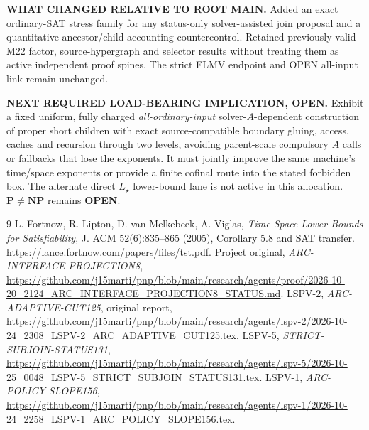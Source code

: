 \documentclass[11pt]{article}
\begin{document}
\noindent\textbf{WHAT CHANGED RELATIVE TO ROOT MAIN.}
Added an exact ordinary-SAT stress family for any status-only solver-assisted join proposal and a quantitative ancestor/child accounting countercontrol. Retained previously valid M22 factor, source-hypergraph and selector results without treating them as active independent proof spines. The strict FLMV endpoint and OPEN all-input link remain unchanged.

\noindent\textbf{NEXT REQUIRED LOAD-BEARING IMPLICATION, OPEN.}
Exhibit a fixed uniform, fully charged \emph{all-ordinary-input} solver-\(A\)-dependent construction of proper short children with exact source-compatible boundary gluing, access, caches and recursion through two levels, avoiding parent-scale compulsory \(A\) calls or fallbacks that lose the exponents. It must jointly improve the same machine's time/space exponents or provide a finite cofinal route into the stated forbidden box. The alternate direct \(L_\star\) lower-bound lane is not active in this allocation. \(\mathbf{P\ne NP}\) remains \textbf{OPEN}.

\begin{thebibliography}{9}
 L. Fortnow, R. Lipton, D. van Melkebeek, A. Viglas, \emph{Time-Space Lower Bounds for Satisfiability}, J. ACM 52(6):835--865 (2005), Corollary 5.8 and SAT transfer. \url{https://lance.fortnow.com/papers/files/tst.pdf}.
 Project original, \emph{ARC-INTERFACE-PROJECTION8}, \url{https://github.com/j15marti/pnp/blob/main/research/agents/proof/2026-10-20_2124_ARC_INTERFACE_PROJECTION8_STATUS.md}.
 LSPV-2, \emph{ARC-ADAPTIVE-CUT125}, original report, \url{https://github.com/j15marti/pnp/blob/main/research/agents/lspv-2/2026-10-24_2308_LSPV-2_ARC_ADAPTIVE_CUT125.tex}.
 LSPV-5, \emph{STRICT-SUBJOIN-STATUS131}, \url{https://github.com/j15marti/pnp/blob/main/research/agents/lspv-5/2026-10-25_0048_LSPV-5_STRICT_SUBJOIN_STATUS131.tex}.
 LSPV-1, \emph{ARC-POLICY-SLOPE156}, \url{https://github.com/j15marti/pnp/blob/main/research/agents/lspv-1/2026-10-24_2258_LSPV-1_ARC_POLICY_SLOPE156.tex}.
\end{thebibliography}
\end{document}
